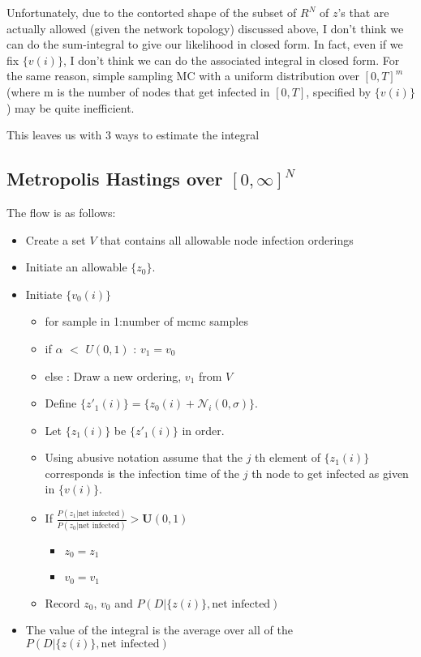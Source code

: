 \documentclass{article}
\begin{document}
Unfortunately, due to the contorted shape of the subset of
$R^N$ of $z$'s that are actually allowed (given the network topology)
discussed above, I don't think we can do the sum-integral to give our
likelihood in closed form. In fact, even if we fix $\{v(i)\}$, I don't
think we can do the associated integral in closed form. For the same
reason, simple sampling MC with a uniform distribution over $[0, T]^m$
(where m is the number of nodes that get infected in $[0, T]$, specified
by $\{v(i)\}$) may be quite inefficient.

This leaves us with 3 ways to estimate the integral

\subsection{Metropolis Hastings over $[0, \infty]^N$}

The flow is as follows:
\begin{itemize}
\item Create a set $V$ that contains all allowable node infection orderings
\item Initiate an allowable $\{z_0\}$.
\item Initiate $\{v_0(i)\}$
\begin{itemize}
\item for sample in 1:number of mcmc samples
\item if $\alpha$ $<$ $U(0,1)$ : $v_1 = v_0$
\item else : Draw a new ordering, $v_1$ from $V$
\item Define $\{z'_1(i)\} = \{z_0(i) + \mathcal{N}_i(0, \sigma)\}$.
\item Let $\{z_1(i)\}$ be $\{z'_1(i)\}$ in order.
\item Using abusive notation assume that the $j$ th element of $\{z_1(i)\}$ corresponds is the infection time of the $j$ th node to get
infected as given in $\{v(i)\}$.
\item If $\frac{P(z_1 | \text{net infected})}{P(z_0 | \text{net infected})} > \mathbf{U}(0,1)$
\begin{itemize}
\item $z_0 =z_1$
\item $v_0 = v_1$
\end{itemize}
\item Record $z_0$, $v_0$ and $P(D | \{z(i)\}, \text{net infected} )$
\end{itemize}
\item The value of the integral is the average over all of the $P(D | \{z(i)\}, \text{net infected} )$
\end{itemize}
\end{document}
